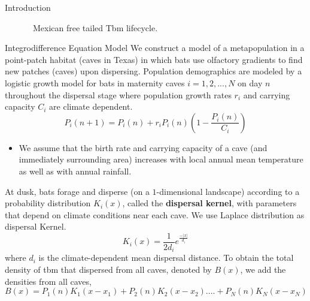 \documentclass[final]{beamer}
\newlength{\colwidth}
\begin{document}
\begin{frame}[t]
\begin{columns}[t]
\begin{column}{\colwidth}
\begin{block}{Introduction}
\begin{figure}
\hfill
      \caption{\ Mexican free tailed Tbm lifecycle.}
      \end{figure}
  \end{block}
  \begin{block}{Integrodifference Equation Model}
 We construct a model of a metapopulation in a point-patch habitat (caves in Texas) in which bats use olfactory gradients to find new patches (caves) upon dispersing. Population demographics are modeled by a logistic growth model for bats in maternity caves $i=1, 2, ..., N$ on day $n$ throughout the dispersal stage where population growth rates $r_i$ and carrying capacity $C_i$ are climate dependent.
\begin{equation}
    P_i(n + 1) = P_i(n) + r_i  P_i(n)\left(1-\frac{P_i(n)}{C_i}\right) 
\end{equation}
    \begin{itemize}
      \item  We assume that the birth rate and carrying capacity of a cave (and immediately surrounding area) increases with local annual mean temperature as well as with annual rainfall.
    \end{itemize}
    At dusk, bats forage and disperse (on a $1$-dimensional landscape) according to a probability distribution $K_i(x)$, called the \textbf{dispersal kernel}, with parameters that depend on climate conditions near each cave. We use  Laplace distribution as dispersal Kernel.
\begin{equation}
    K_i(x) =
\frac{1}{2d_i} e^{\frac{-|x|}{d_i}}
\end{equation}
where $d_i$ is the climate-dependent mean dispersal distance.
To obtain the total density of tbm that dispersed from all caves, denoted by $B(x)$, we add the densities from all caves,
\begin{equation}
    B(x) = P_1(n)K_1(x-x_1) + P_2(n)K_2(x-x_2) .... + P_N(n)K_N(x-x_N):
\end{equation}
  \begin{figure}
      \hfill

\end{figure}
\end{block}
\end{column}
\end{columns}
\end{frame}
\end{document}

